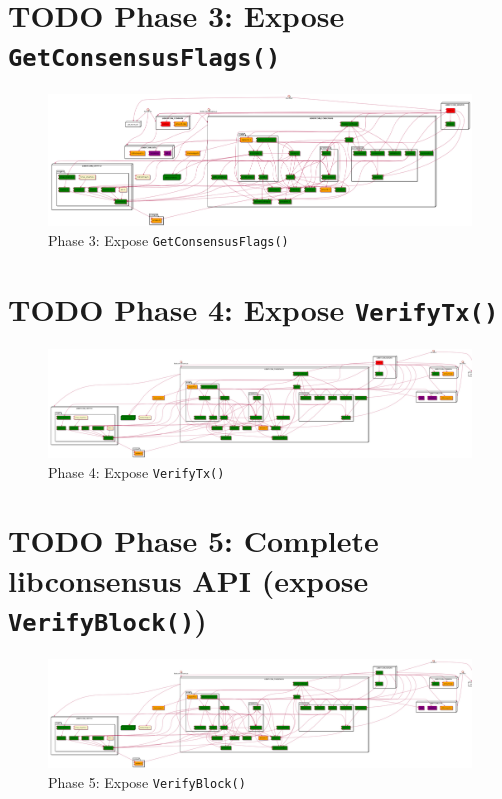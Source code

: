\documentclass[11pt]{article}
\begin{document}
\newpage
\section{{\bfseries\sffamily TODO} Phase 3: Expose \texttt{GetConsensusFlags()}}
\label{sec-4}

\begin{figure}[htb]
\centering
\includegraphics[width=.9\linewidth]{./img/6_phase3_libconsensus.png}
\caption{\label{pic_6_phase3}Phase 3: Expose \texttt{GetConsensusFlags()}}
\end{figure}

\newpage
\section{{\bfseries\sffamily TODO} Phase 4: Expose \texttt{VerifyTx()}}
\label{sec-5}

\begin{figure}[htb]
\centering
\includegraphics[width=.9\linewidth]{./img/7_phase4_libconsensus.png}
\caption{\label{pic_7_phase4}Phase 4: Expose \texttt{VerifyTx()}}
\end{figure}

\newpage
\section{{\bfseries\sffamily TODO} Phase 5: Complete libconsensus API (expose \texttt{VerifyBlock()})}
\label{sec-6}

\begin{figure}[htb]
\centering
\includegraphics[width=.9\linewidth]{./img/8_phase5_libconsensus.png}
\caption{\label{pic_8_phase5}Phase 5: Expose \texttt{VerifyBlock()}}
\end{figure}
\end{document}
